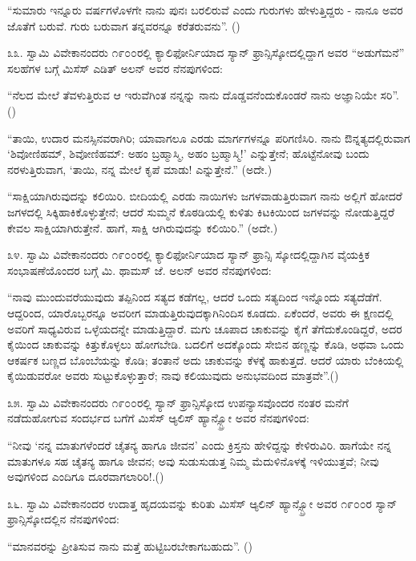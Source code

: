 “ಸುಮಾರು ಇನ್ನೂರು ವರ್ಷಗಳೊಳಗೇ ನಾನು ಪುನಃ ಬರಲಿರುವೆ ಎಂದು ಗುರುಗಳು ಹೇಳುತ್ತಿದ್ದರು - ನಾನೂ ಅವರ ಜೊತೆಗೆ ಬರುವೆ. ಗುರು ಬರುವಾಗ ತನ್ನವರನ್ನೂ ಕರೆತರುವನು”. ()

೩೩. ಸ್ವಾಮಿ ವಿವೇಕಾನಂದರು ೧೯೦೦ರಲ್ಲಿ ಕ್ಯಾಲಿಫೋರ್ನಿಯಾದ ಸ್ಯಾನ್ ಫ್ರಾನ್ಸಿಸ್ಕೋದಲ್ಲಿದ್ದಾಗ ಅವರ “ಅಡುಗೆಮನೆ” ಸಲಹೆಗಳ ಬಗ್ಗೆ ಮಿಸೆಸ್ ಎಡಿತ್ ಅಲನ್ ಅವರ ನೆನಪುಗಳಿಂದ:

“ನೆಲದ ಮೇಲೆ ತೆವಳುತ್ತಿರುವ ಆ ಇರುವೆಗಿಂತ ನನ್ನನ್ನು ನಾನು ದೊಡ್ಡವನೆಂದುಕೊಂಡರೆ ನಾನು ಅಜ್ಞಾನಿಯೇ ಸರಿ”. ()

“ತಾಯಿ, ಉದಾರ ಮನಸ್ಸಿನವರಾಗಿರಿ; ಯಾವಾಗಲೂ ಎರಡು ಮಾರ್ಗಗಳನ್ನೂ ಪರಿಗಣಿಸಿರಿ. ನಾನು ಔನ್ನತ್ಯದಲ್ಲಿರುವಾಗ ‘ಶಿವೋಣಿಹಮ್​, ಶಿವೋಣಿಹಮ್​: ಅಹಂ ಬ್ರಹ್ಮಾಸ್ಮಿ, ಅಹಂ ಬ್ರಹ್ಮಾಸ್ಮಿ!’ ಎನ್ನುತ್ತೇನೆ; ಹೊಟ್ಟೆನೋವು ಬಂದು ನರಳುತ್ತಿರುವಾಗ, ‘ತಾಯಿ, ನನ್ನ ಮೇಲೆ ಕೃಪೆ ಮಾಡು! ಎನ್ನುತ್ತೇನೆ.” (ಅದೇ.)

“ಸಾಕ್ಷಿಯಾಗಿರುವುದನ್ನು ಕಲಿಯಿರಿ. ಬೀದಿಯಲ್ಲಿ ಎರಡು ನಾಯಿಗಳು ಜಗಳವಾಡುತ್ತಿರುವಾಗ ನಾನು ಅಲ್ಲಿಗೆ ಹೋದರೆ ಜಗಳದಲ್ಲಿ ಸಿಕ್ಕಿಹಾಕಿಕೊಳ್ಳುತ್ತೇನೆ; ಆದರೆ ಸುಮ್ಮನೆ ಕೊಠಡಿಯಲ್ಲಿ ಕುಳಿತು ಕಿಟಕಿಯಿಂದ ಜಗಳವನ್ನು ನೋಡುತ್ತಿದ್ದರೆ ಕೇವಲ ಸಾಕ್ಷಿಯಾಗಿರುತ್ತೇನೆ. ಹಾಗೆ, ಸಾಕ್ಷಿ ಆಗಿರುವುದನ್ನು ಕಲಿಯಿರಿ.” (ಅದೇ.)

೩೪. ಸ್ವಾಮಿ ವಿವೇಕಾನಂದರು ೧೯೦೦ರಲ್ಲಿ ಕ್ಯಾಲಿಫೋರ್ನಿಯಾದ ಸ್ಯಾನ್ ಫ್ರಾನ್ಸಿ ಸ್ಕೋದಲ್ಲಿದ್ದಾಗಿನ ವೈಯಕ್ತಿಕ ಸಂಭಾಷಣೆಯೊಂದರ ಬಗ್ಗೆ ಮಿ. ಥಾಮಸ್ ಜೆ. ಅಲನ್ ಅವರ ನೆನಪುಗಳಿಂದ:

“ನಾವು ಮುಂದುವರೆಯುವುದು ತಪ್ಪಿನಿಂದ ಸತ್ಯದ ಕಡೆಗಲ್ಲ, ಆದರೆ ಒಂದು ಸತ್ಯದಿಂದ ಇನ್ನೊಂದು ಸತ್ಯದೆಡೆಗೆ. ಆದ್ದರಿಂದ, ಯಾರೊಬ್ಬರನ್ನೂ ಅವರೀಗ ಮಾಡುತ್ತಿರುವುದಕ್ಕಾಗಿನಿಂದಿಸ ಕೂಡದು. ಏಕೆಂದರೆ, ಅವರು ಈ ಕ್ಷಣದಲ್ಲಿ ಅವರಿಗೆ ಸಾಧ್ಯವಿರುವ ಒಳ್ಳೆಯದನ್ನೇ ಮಾಡುತ್ತಿದ್ದಾರೆ. ಮಗು ಚೂಪಾದ ಚಾಕುವನ್ನು ಕೈಗೆ ತೆಗೆದುಕೊಂಡಿದ್ದರೆ, ಅದರ ಕೈಯಿಂದ ಚಾಕುವನ್ನು ಕಿತ್ತುಕೊಳ್ಳಲು ಹೋಗಬೇಡಿ. ಬದಲಿಗೆ ಅದಕ್ಕೊಂದು ಸೇಬಿನ ಹಣ್ಣನ್ನು ಕೊಡಿ, ಅಥವಾ ಒಂದು ಆಕರ್ಷಕ ಬಣ್ಣದ ಬೊಂಬೆಯನ್ನು ಕೊಡಿ; ತಂತಾನೆ ಅದು ಚಾಕುವನ್ನು ಕೆಳಕ್ಕೆ ಹಾಕುತ್ತದೆ. ಆದರೆ ಯಾರು ಬೆಂಕಿಯಲ್ಲಿ ಕೈಯಿಡುವರೋ ಅವರು ಸುಟ್ಟುಕೊಳ್ಳುತ್ತಾರೆ; ನಾವು ಕಲಿಯುವುದು ಅನುಭವದಿಂದ ಮಾತ್ರವೇ”.()

೩೫. ಸ್ವಾಮಿ ವಿವೇಕಾನಂದರು ೧೯೦೦ರಲ್ಲಿ ಸ್ಯಾನ್ ಫ್ರಾನ್ಸಿಸ್ಕೋದ ಉಪನ್ಯಾಸವೊಂದರ ನಂತರ ಮನೆಗೆ ನಡೆದುಹೋಗುವ ಸಂದರ್ಭದ ಬಗೆಗೆ ಮಿಸೆಸ್ ಆ್ಯಲಿಸ್ ಹ್ಯಾನ್ಸ್ಬ್ರೋ ಅವರ ನೆನಪುಗಳಿಂದ:

“ನೀವು ‘ನನ್ನ ಮಾತುಗಳೆಂದರೆ ಚೈತನ್ಯ ಹಾಗೂ ಜೀವನ’ ಎಂದು ಕ್ರಿಸ್ತನು ಹೇಳಿದ್ದನ್ನು ಕೇಳಿರುವಿರಿ. ಹಾಗೆಯೇ ನನ್ನ ಮಾತುಗಳೂ ಸಹ ಚೈತನ್ಯ ಹಾಗೂ ಜೀವನ; ಅವು ಸುಡುಸುಡುತ್ತ ನಿಮ್ಮ ಮೆದುಳಿನೊಳಕ್ಕೆ ಇಳಿಯುತ್ತವೆ; ನೀವು ಅವುಗಳಿಂದ ಎಂದಿಗೂ ದೂರವಾಗಲಾರಿರಿ!.()

೩೬. ಸ್ವಾಮಿ ವಿವೇಕಾನಂದರ ಉದಾತ್ತ ಹೃದಯವನ್ನು ಕುರಿತು ಮಿಸೆಸ್ ಆ್ಯಲಿನ್ ಹ್ಯಾನ್ಸ್ಬ್ರೋ ಅವರ ೧೯೦೦ರ ಸ್ಯಾನ್ ಫ್ರಾನ್ಸಿಸ್ಕೋದಲ್ಲಿನ ನೆನಪುಗಳಿಂದ:

“ಮಾನವರನ್ನು ಪ್ರೀತಿಸುವ ನಾನು ಮತ್ತೆ ಹುಟ್ಟಿಬರಬೇಕಾಗಬಹುದು”. ()

